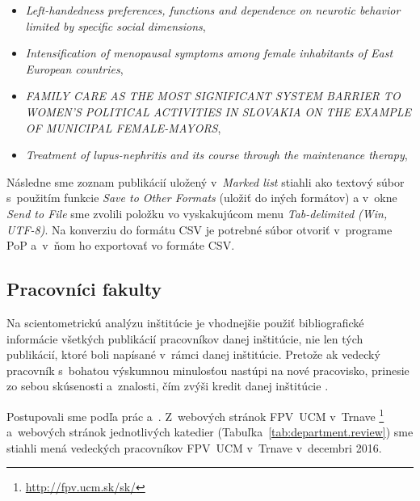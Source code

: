 \begin{itemize}
\item \emph{Left-handedness preferences, functions and dependence on neurotic
    behavior limited by specific social dimensions},
\item \emph{Intensification of menopausal symptoms among female inhabitants of
    East European countries},
\item \emph{FAMILY CARE AS THE MOST SIGNIFICANT SYSTEM BARRIER TO WOMEN'S
    POLITICAL ACTIVITIES IN SLOVAKIA ON THE EXAMPLE OF MUNICIPAL FEMALE-MAYORS},
\item \emph{Treatment of lupus-nephritis and its course through the maintenance
    therapy},
\end{itemize}

Následne sme zoznam publikácií uložený v~\emph{Marked list} stiahli ako textový
súbor s~použitím funkcie \emph{Save to Other Formats} (uložiť do iných formátov)
a v~okne \emph{Send to File} sme zvolili položku vo vyskakujúcom menu
\emph{Tab-delimited (Win, UTF-8)}.  Na konverziu do formátu CSV je potrebné
súbor otvoriť v~programe PoP \citep{Harzing2011} a~v~ňom ho exportovať vo
formáte CSV.


\subsection{Pracovníci fakulty}
\label{sec:staff.mining}

Na scientometrickú analýzu inštitúcie je vhodnejšie použiť bibliografické
informácie všetkých publikácií pracovníkov danej inštitúcie, nie len tých
publikácií, ktoré boli napísané v~rámci danej inštitúcie.  Pretože ak vedecký
pracovník s~bohatou výskumnou minulosťou nastúpi na nové pracovisko, prinesie zo
sebou skúsenosti a~znalosti, čím zvýši kredit danej inštitúcie
\citep{Altanopoulou2012}.

Postupovali sme podľa prác \citet{Kazakis2014a}
a~\citet{Kazakis2014b,Kazakis2015}.  Z~webových stránok FPV~UCM v~Trnave%
\footnote{\url{http://fpv.ucm.sk/sk/}} a~webových stránok jednotlivých
katedier (Tabuľka~\ref{tab:department.review}) sme stiahli mená vedeckých
pracovníkov FPV~UCM v~Trnave v~decembri 2016.

